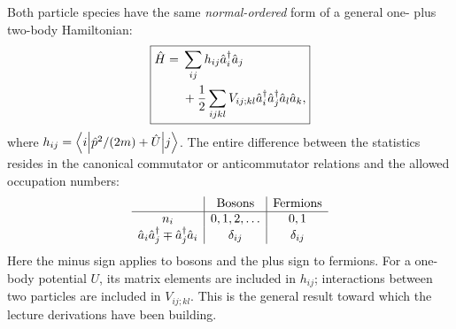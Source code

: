 Both particle species have the same \emph{normal-ordered} form of a general one- plus two-body Hamiltonian:
\begin{equation}
\boxed{\begin{aligned}
\hat{H}={}&\sum_{ij}h_{ij}\hat{a}_i^\dagger\hat{a}_j\\
 &+\frac12\sum_{ijkl}V_{ij;kl}\hat{a}_i^\dagger\hat{a}_j^\dagger\hat{a}_l\hat{a}_k,
\end{aligned}}
\end{equation}
where $h_{ij}=\left\langle i\middle|\hat{p}^2/(2m)+\hat{U}\middle|j\right\rangle$. The entire difference between the statistics resides in the canonical commutator or anticommutator relations and the allowed occupation numbers:
\begin{equation}
\begin{array}{c|c|c}
 &\text{Bosons}&\text{Fermions}\\\hline
n_i&0,1,2,\ldots&0,1\\
\hat{a}_i\hat{a}_j^\dagger\mp\hat{a}_j^\dagger\hat{a}_i
&\delta_{ij}&\delta_{ij}\\
\end{array}
\end{equation}
Here the minus sign applies to bosons and the plus sign to fermions. For a one-body potential $U$, its matrix elements are included in $h_{ij}$; interactions between two particles are included in $V_{ij;kl}$. This is the general result toward which the lecture derivations have been building.